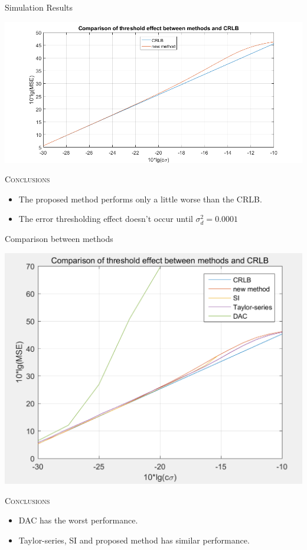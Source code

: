 \documentclass[10pt]{beamer}
\begin{document}
\begin{frame}{Simulation Results}
  \begin{center}
  \includegraphics[scale=0.35]{img/fig4.JPG}
  \end{center}
  \begin{center} \textsc{Conclusions} \end{center}
  \begin{itemize}
    \item \small The proposed method performs only a little worse than the CRLB.
    \item \small The error thresholding effect doesn't occur until $ \sigma_d^2 = 0.0001 $
  \end{itemize}
\end{frame}

\begin{frame}{Comparison between methods}
  \begin{center}
  \includegraphics[scale = 0.25]{img/compare.png}
  \end{center}
  \begin{center} \textsc{Conclusions} \end{center}
  \begin{itemize}
    \item \small DAC has the worst performance.
    \item \small Taylor-series, SI and proposed method has similar performance.
  \end{itemize}
\end{frame}
\end{document}
